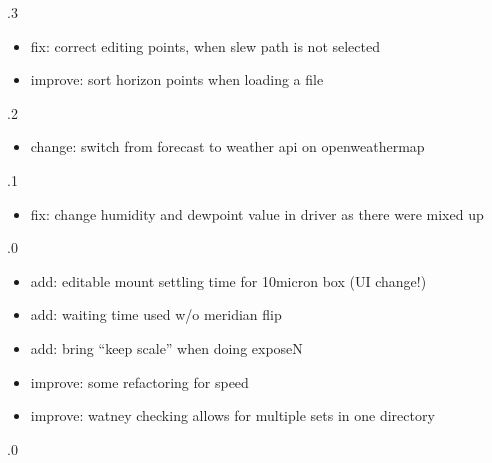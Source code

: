 \documentclass[a4paper,10pt,english]{sphinxmanual}
\begin{document}
.3
\begin{itemize}
\item {} 
\sphinxAtStartPar
fix: correct editing points, when slew path is not selected

\item {} 
\sphinxAtStartPar
improve: sort horizon points when loading a file

\end{itemize}

.2
\begin{itemize}
\item {} 
\sphinxAtStartPar
change: switch from forecast to weather api on openweathermap

\end{itemize}

.1
\begin{itemize}
\item {} 
\sphinxAtStartPar
fix: change humidity and dewpoint value in driver as there were mixed up

\end{itemize}

.0
\begin{itemize}
\item {} 
\sphinxAtStartPar
add: editable mount settling time for 10micron box (UI change!)

\item {} 
\sphinxAtStartPar
add: waiting time used w/o  meridian flip

\item {} 
\sphinxAtStartPar
add: bring “keep scale” when doing exposeN

\item {} 
\sphinxAtStartPar
improve: some refactoring for speed

\item {} 
\sphinxAtStartPar
improve: watney checking allows for multiple sets in one directory

\end{itemize}

.0
\end{document}
